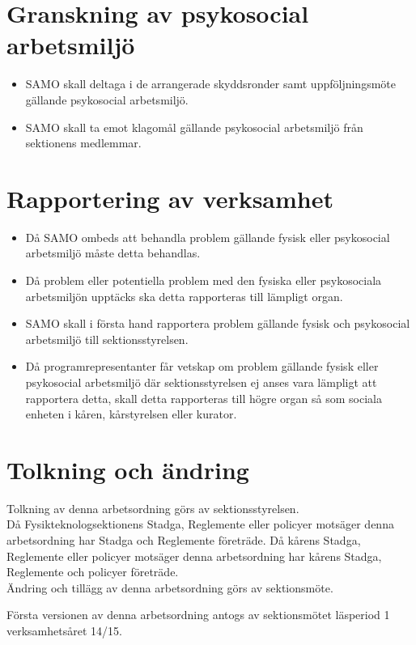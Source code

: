 \section{Granskning av psykosocial arbetsmiljö}
\begin{itemize}
\item SAMO skall deltaga i de arrangerade skyddsronder samt uppföljningsmöte gällande psykosocial arbetsmiljö.

\item SAMO skall ta emot klagomål gällande psykosocial arbetsmiljö från sektionens medlemmar.
\end{itemize}

\section{Rapportering av verksamhet}
\begin{itemize}
\item Då SAMO ombeds att behandla problem gällande fysisk eller psykosocial arbetsmiljö måste detta behandlas.

\item Då problem eller potentiella problem med den fysiska eller psykosociala arbetsmiljön upptäcks ska detta rapporteras till lämpligt organ.

\item SAMO skall i första hand rapportera problem gällande fysisk och psykosocial arbetsmiljö till sektionsstyrelsen.

\item Då programrepresentanter får vetskap om problem gällande fysisk eller psykosocial arbetsmiljö där sektionsstyrelsen ej anses vara lämpligt att rapportera detta, skall detta rapporteras till högre organ så som sociala enheten i kåren, kårstyrelsen eller kurator.

\end{itemize}

\section{Tolkning och ändring}
Tolkning av denna arbetsordning görs av sektionsstyrelsen.\\ Då Fysikteknologsektionens Stadga, Reglemente eller policyer motsäger denna arbetsordning har Stadga och Reglemente företräde. Då kårens Stadga, Reglemente eller policyer motsäger denna arbetsordning har kårens Stadga, Reglemente och policyer företräde.\\
Ändring och tillägg av denna arbetsordning görs av sektionsmöte.


Första versionen av denna arbetsordning antogs av sektionsmötet läsperiod 1 verksamhetsåret 14/15.

\newpage
